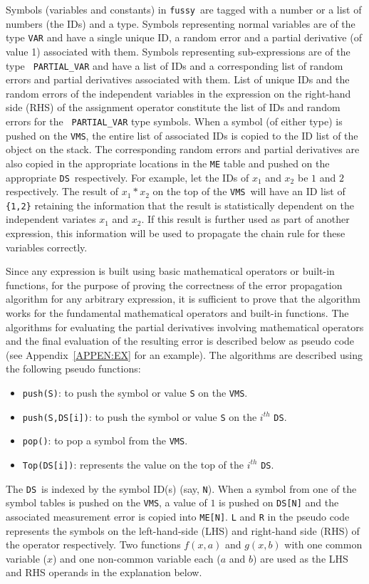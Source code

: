 \documentclass[12pt]{article}
\newcommand{\Fussy}{{\tt fussy}}
\newcommand{\DS}{{\tt DS}}
\newcommand{\VMS}{{\tt VMS}}
\begin{document}
Symbols (variables and constants) in \Fussy\ are tagged with a number
or a list of numbers (the IDs) and a type.  Symbols representing
normal variables are of the type {\tt VAR} and have a single unique
ID, a random error and a partial derivative (of value 1) associated
with them.  Symbols representing sub-expressions are of the type {\tt
PARTIAL\_VAR} and have a list of IDs and a corresponding list of
random errors and partial derivatives associated with them.  List of
unique IDs and the random errors of the independent variables in the
expression on the right-hand side (RHS) of the assignment operator
constitute the list of IDs and random errors for the {\tt
PARTIAL\_VAR} type symbols.  When a symbol (of either type) is pushed
on the \VMS, the entire list of associated IDs is copied to the ID
list of the object on the stack.  The corresponding random errors and
partial derivatives are also copied in the appropriate locations in
the {\tt ME} table and pushed on the appropriate \DS\ respectively.
For example, let the IDs of $x_1$ and $x_2$ be $1$ and $2$
respectively.  The result of $x_1 * x_2$ on the top of the \VMS\ will
have an ID list of {\tt \{1,2\}} retaining the information that the
result is statistically dependent on the independent variates $x_1$
and $x_2$.  If this result is further used as part of another
expression, this information will be used to propagate the chain rule
for these variables correctly.

Since any expression is built using basic mathematical operators or
built-in functions, for the purpose of proving the correctness of the
error propagation algorithm for any arbitrary expression, it is
sufficient to prove that the algorithm works for the fundamental
mathematical operators and built-in functions.  The algorithms for
evaluating the partial derivatives involving mathematical operators
and the final evaluation of the resulting error is described below as
pseudo code (see Appendix~\ref{APPEN:EX} for an example).  The
algorithms are described using the following pseudo functions:
\begin{itemize}
\item {\tt push(S)}: to push the symbol or value {\tt S} on the \VMS. 
\item {\tt push(S,DS[i])}: to push the symbol or value {\tt S} on the
$i^{th}$ \DS.  
\item {\tt pop()}: to pop a symbol from the \VMS.
\item {\tt Top(DS[i])}:  represents the value on the top of the
$i^{th}$ \DS. 
\end{itemize}
The \DS\ is indexed by the symbol ID(s) (say, {\tt N}).  When a symbol
from one of the symbol tables is pushed on the \VMS, a value of $1$ is
pushed on {\tt DS[N]} and the associated measurement error is copied
into {\tt ME[N]}.  {\tt L} and {\tt R} in the pseudo code represents
the symbols on the left-hand-side (LHS) and right-hand side (RHS) of
the operator respectively.  Two functions $f(x,a)$ and $g(x,b)$ with
one common variable ($x$) and one non-common variable each ($a$ and
$b$) are used as the LHS and RHS operands in the explanation below.
\end{document}
